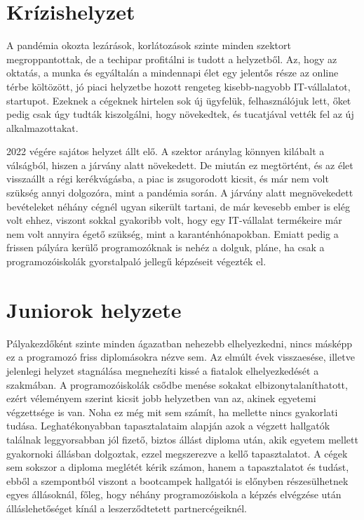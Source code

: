 \documentclass{thesis-ekf}
\begin{document}
\section{Krízishelyzet}
A pandémia okozta lezárások, korlátozások szinte minden szektort megroppantottak, de a techipar profitálni is tudott a helyzetből. Az, hogy az oktatás, a munka és egyáltalán a mindennapi élet egy jelentős része az online térbe költözött, jó piaci helyzetbe hozott rengeteg kisebb-nagyobb IT-vállalatot, startupot. Ezeknek a cégeknek hirtelen sok új ügyfelük, felhasználójuk lett, őket pedig csak úgy tudták kiszolgálni, hogy növekedtek, és tucatjával vették fel az új alkalmazottakat.

2022 végére sajátos helyzet állt elő. A szektor aránylag könnyen kilábalt a válságból, hiszen a járvány alatt növekedett. De miután ez megtörtént, és az élet visszaállt a régi kerékvágásba, a piac is zsugorodott kicsit, és már nem volt szükség annyi dolgozóra, mint a pandémia során. A járvány alatt megnövekedett bevételeket néhány cégnél ugyan sikerült tartani, de már kevesebb ember is elég volt ehhez, viszont sokkal gyakoribb volt, hogy egy IT-vállalat termékeire már nem volt annyira égető szükség, mint a karanténhónapokban. \cite{krizis} Emiatt pedig a frissen pályára kerülő programozóknak is nehéz a dolguk, pláne, ha csak a programozóiskolák gyorstalpaló jellegű képzéseit végezték el. \cite{palyakezdok}

\section{Juniorok helyzete}
Pályakezdőként szinte minden ágazatban nehezebb elhelyezkedni, nincs másképp ez a programozó friss diplomásokra nézve sem. Az elmúlt évek visszaesése, illetve jelenlegi helyzet stagnálása megnehezíti kissé a fiatalok elhelyezkedését a szakmában. A programozóiskolák csődbe menése sokakat elbizonytalaníthatott, ezért véleményem szerint kicsit jobb helyzetben van az, akinek egyetemi végzettsége is van. Noha ez még mit sem számít, ha mellette nincs gyakorlati tudása. Leghatékonyabban tapasztalataim alapján azok a végzett hallgatók találnak leggyorsabban jól fizető, biztos állást diploma után, akik egyetem mellett gyakornoki állásban dolgoztak, ezzel megszerezve a kellő tapasztalatot. A cégek sem sokszor a diploma meglétét kérik számon, hanem a tapasztalatot és tudást, ebből a szempontból viszont a bootcampek hallgatói is előnyben részesülhetnek egyes állásoknál, főleg, hogy néhány programozóiskola a képzés elvégzése után álláslehetőséget kínál a leszerződtetett partnercégeiknél.
\end{document}
